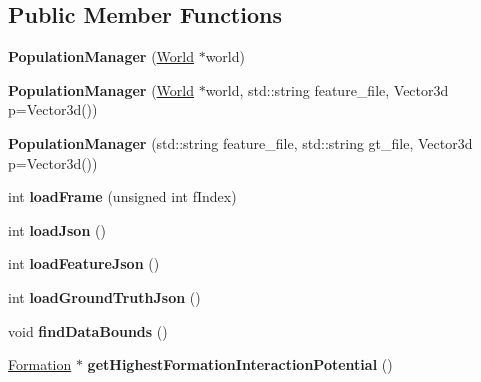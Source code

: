 \subsection*{Public Member Functions}
\begin{DoxyCompactItemize}
\item 
{\bfseries Population\+Manager} (\hyperlink{classWorld}{World} $\ast$world)\hypertarget{classPopulationManager_a358c64c798fb4f77958cb45f9da768b1}{}\label{classPopulationManager_a358c64c798fb4f77958cb45f9da768b1}

\item 
{\bfseries Population\+Manager} (\hyperlink{classWorld}{World} $\ast$world, std\+::string feature\+\_\+file, Vector3d p=Vector3d())\hypertarget{classPopulationManager_af6ec5e12d10cda4641e251e5ed873370}{}\label{classPopulationManager_af6ec5e12d10cda4641e251e5ed873370}

\item 
{\bfseries Population\+Manager} (std\+::string feature\+\_\+file, std\+::string gt\+\_\+file, Vector3d p=Vector3d())\hypertarget{classPopulationManager_aa083bdb9f3f534efa38eaa77455af812}{}\label{classPopulationManager_aa083bdb9f3f534efa38eaa77455af812}

\item 
int {\bfseries load\+Frame} (unsigned int f\+Index)\hypertarget{classPopulationManager_a2c893024ba17d5b106490ce9487ba86f}{}\label{classPopulationManager_a2c893024ba17d5b106490ce9487ba86f}

\item 
int {\bfseries load\+Json} ()\hypertarget{classPopulationManager_a08dc1edfd34f15596558e7c8e348e04a}{}\label{classPopulationManager_a08dc1edfd34f15596558e7c8e348e04a}

\item 
int {\bfseries load\+Feature\+Json} ()\hypertarget{classPopulationManager_a01822daf4197ca03f2139e52bbc18da9}{}\label{classPopulationManager_a01822daf4197ca03f2139e52bbc18da9}

\item 
int {\bfseries load\+Ground\+Truth\+Json} ()\hypertarget{classPopulationManager_af3cd5b0b6f3d60def4ed1155cd7b63b6}{}\label{classPopulationManager_af3cd5b0b6f3d60def4ed1155cd7b63b6}

\item 
void {\bfseries find\+Data\+Bounds} ()\hypertarget{classPopulationManager_aea9e6453830edea5dfeb25c591995274}{}\label{classPopulationManager_aea9e6453830edea5dfeb25c591995274}

\item 
\hyperlink{classFormation}{Formation} $\ast$ {\bfseries get\+Highest\+Formation\+Interaction\+Potential} ()\hypertarget{classPopulationManager_ab856989f3b690ed28ec62346f89084a1}{}\label{classPopulationManager_ab856989f3b690ed28ec62346f89084a1}


\end{DoxyCompactItemize}
